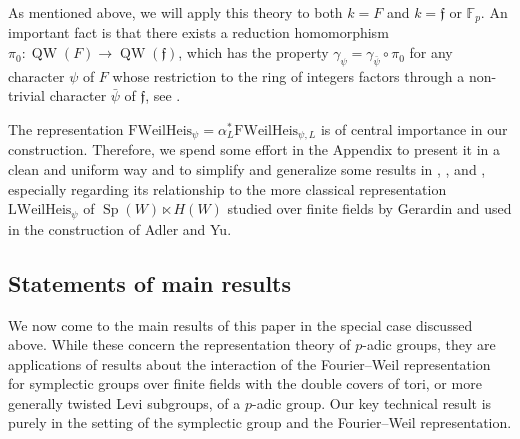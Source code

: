 \documentclass{article}
\newcommand{\bF}{\mathbb{F}}
\DeclareMathOperator{\Sp}{Sp}
\theoremstyle{definition}
\numberwithin{equation}{subsection}
\renewcommand{\-}{\hyp{}}
\DeclareMathOperator{\QW}{QW}
\newcommand{\rf}{\mathfrak{f}}
\begin{document}
As mentioned above, we will apply this theory to both $k=F$ and $k=\rf$ or $\bF_p$. An important fact is that there exists a reduction homomorphism $\pi_0 : \QW(F) \to \QW(\rf)$, which has the property $\gamma_\psi = \gamma_{\bar\psi}\circ\pi_0$ for any character $\psi$ of $F$ whose restriction to the ring of integers factors through a non-trivial character $\bar\psi$ of $\rf$, see \cite[Appendix A]{RR93}.

The representation $\mathrm{FWeilHeis}_\psi=\alpha_L^*\mathrm{FWeilHeis}_{\psi,L}$ is of central importance in our construction. Therefore, we spend some effort in the Appendix to present it in a clean and uniform way and to simplify and generalize some results in \cite{LionVergne}, \cite{RR93}, and \cite{Thomas2013}, especially regarding its relationship to the more classical representation $\mathrm{LWeilHeis}_\psi$ of $\Sp(W) \ltimes H(W)$ studied over finite fields by Gerardin \cite{Gerardin} and used in the construction of Adler and Yu.

\subsection{Statements of main results}

We now come to the main results of this paper in the special case discussed above. While these concern the representation theory of $p$-adic groups, they are applications of results about the interaction of the Fourier--Weil representation for symplectic groups over finite fields with the double covers of tori, or more generally twisted Levi subgroups, of a $p$-adic group. Our key technical result is purely in the setting of the symplectic group and the Fourier--Weil representation.
\end{document}
